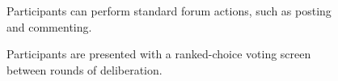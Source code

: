\begin{figure}
\center
{}
\caption{Participants can perform standard forum actions, such as posting and commenting.}
\label{fig:reply}
\end{figure}

\begin{figure}
\center
{}
\caption{Participants are presented with a ranked-choice voting screen between rounds of deliberation.}
\label{fig:vote}
\end{figure}

